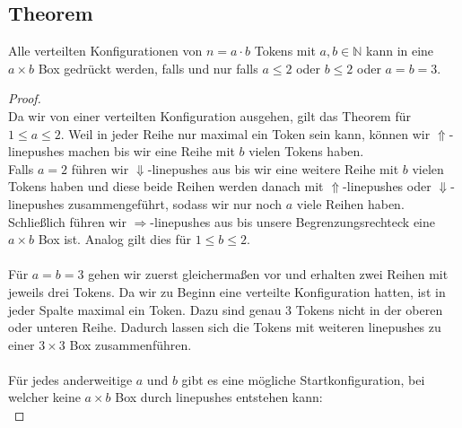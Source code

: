 \documentclass[seminar,german]{algothesis}
\begin{document}
\subsection{Theorem}
Alle verteilten Konfigurationen von $n=a\cdot b$ Tokens mit $a,b\in \mathbb{N}$ kann in eine $a \times b$ Box gedrückt werden, falls und nur falls $a\leq 2$ oder $b\leq 2$ oder $a=b=3$.
\begin{proof}\noindent\\
Da wir von einer verteilten Konfiguration ausgehen, gilt das Theorem für $1\leq a\leq 2$. Weil in jeder Reihe nur maximal ein Token sein kann, können wir $\Uparrow$-linepushes machen bis wir eine Reihe mit $b$ vielen Tokens haben. \\
Falls $a = 2$ führen wir $\Downarrow$-linepushes aus bis wir eine weitere Reihe mit $b$ vielen Tokens haben und diese beide Reihen werden danach mit $\Uparrow$-linepushes oder $\Downarrow$-linepushes zusammengeführt, sodass wir nur noch $a$  viele Reihen haben. Schließlich führen wir $\Rightarrow$-linepushes aus bis unsere Begrenzungsrechteck eine $a\times b$ Box ist. Analog gilt dies für $1\leq b\leq 2$.\\\\
Für $a=b=3$ gehen wir zuerst gleichermaßen vor und erhalten zwei Reihen mit jeweils drei Tokens. Da wir zu Beginn eine verteilte Konfiguration hatten, ist in jeder Spalte maximal ein Token. Dazu sind genau 3 Tokens nicht in der oberen oder unteren Reihe. Dadurch lassen sich die Tokens mit weiteren linepushes zu einer  $3\times 3$ Box zusammenführen. \\\\
Für jedes anderweitige $a$ und $b$ gibt es eine mögliche Startkonfiguration, bei welcher keine $a\times b$ Box durch linepushes entstehen kann:\\


\end{proof}
\end{document}
